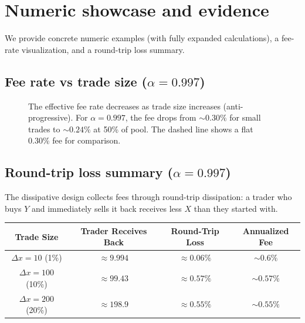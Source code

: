 \documentclass[11pt]{article}
\theoremstyle{definition}
\theoremstyle{remark}
\newcommand{\dx}{\Delta x}
\begin{document}
\section{Numeric showcase and evidence}\label{sec:numerics}
We provide concrete numeric examples (with fully expanded calculations), a fee-rate visualization, and a round-trip loss summary.

\subsection{Fee rate vs trade size ($\alpha=0.997$)}

\begin{figure}[htbp]
\centering
{}
\caption{The effective fee rate decreases as trade size increases (anti-progressive). For $\alpha=0.997$, the fee drops from $\sim\!0.30\%$ for small trades to $\sim\!0.24\%$ at 50\% of pool. The dashed line shows a flat 0.30\% fee for comparison.}
\label{fig:fee-rate}
\end{figure}

\subsection{Round-trip loss summary ($\alpha=0.997$)}

The dissipative design collects fees through round-trip dissipation: a trader who buys $Y$ and immediately sells it back receives less $X$ than they started with.

\begin{center}
\begin{tabular}{@{}cccc@{}}
\toprule
\textbf{Trade Size} & \textbf{Trader Receives Back} & \textbf{Round-Trip Loss} & \textbf{Annualized Fee} \\
\midrule
$\dx=10$ (1\%) & $\approx 9.994$ & $\approx 0.06\%$ & $\sim\!0.6\%$ \\
$\dx=100$ (10\%) & $\approx 99.43$ & $\approx 0.57\%$ & $\sim\!0.57\%$ \\
$\dx=200$ (20\%) & $\approx 198.9$ & $\approx 0.55\%$ & $\sim\!0.55\%$ \\
\bottomrule
\end{tabular}
\end{center}
\end{document}
